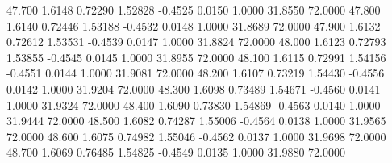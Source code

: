   47.700   1.6148   0.72290   1.52828  -0.4525   0.0150   1.0000  31.8550  72.0000
  47.800   1.6140   0.72446   1.53188  -0.4532   0.0148   1.0000  31.8689  72.0000
  47.900   1.6132   0.72612   1.53531  -0.4539   0.0147   1.0000  31.8824  72.0000
  48.000   1.6123   0.72793   1.53855  -0.4545   0.0145   1.0000  31.8955  72.0000
  48.100   1.6115   0.72991   1.54156  -0.4551   0.0144   1.0000  31.9081  72.0000
  48.200   1.6107   0.73219   1.54430  -0.4556   0.0142   1.0000  31.9204  72.0000
  48.300   1.6098   0.73489   1.54671  -0.4560   0.0141   1.0000  31.9324  72.0000
  48.400   1.6090   0.73830   1.54869  -0.4563   0.0140   1.0000  31.9444  72.0000
  48.500   1.6082   0.74287   1.55006  -0.4564   0.0138   1.0000  31.9565  72.0000
  48.600   1.6075   0.74982   1.55046  -0.4562   0.0137   1.0000  31.9698  72.0000
  48.700   1.6069   0.76485   1.54825  -0.4549   0.0135   1.0000  31.9880  72.0000
